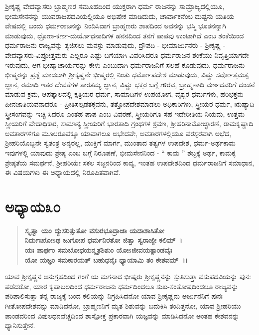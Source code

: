 ಶ‍್ರೀಕೃಷ್ಣ ವೇದವ್ಯಾಸರು ಬ್ರಾಹ್ಮಣರ ಸಮೂಹದಿಂದ ಯುಕ್ತರಾಗಿ ಧರ್ಮ ರಾಜನನ್ನು ಸಾಮ್ರಾಜ್ಯದಲ್ಲಿಯೂ, ಭೀಮಸೇನನನ್ನು ಯುವರಾಜಪದವಿಯಲ್ಲಿಯೂ ಅಭಿಷೇಕ ಮಾಡಿದುದು, ಚಾರ್ವಾಕನೆಂಬ ದುಷ್ಟನು ಯತಿಯ ವೇಷದಲ್ಲಿ ಬಂದು ಧರ್ಮರಾಜನನ್ನು ನಿಂದಿಸಿದಾಗ ಬ್ರಾಹ್ಮಣರು ಶಾಪದಿಂದ ಅವನನ್ನು ಭಸ್ಮಿ ಭೂತನನ್ನಾಗಿ ಮಾಡುವುದು, ದ್ರೋಣ-\-ಕರ್ಣ-ದುರ್ಯೊಧನಾದಿಗಳ ಹನನದಿಂದ ತನಗೆ ಪಾಪವು ಉಂಟಾಗಿದೆ ಎಂಬ ಶಂಕೆಯಿಂದ ಧರ್ಮರಾಜನು ರಾಜ್ಯವನ್ನು ತ್ಯಜಿಸಲು ಮನಸ್ಸು ಮಾಡುವುದು, ದ್ರೌಪದಿ - ಭೀಮಾರ್ಜುನರು - ಶ‍್ರೀಕೃಷ್ಣ - ವೇದವ್ಯಾಸರು-ವಿಪ್ರೋತ್ತಮರು ಎಲ್ಲರೂ ಎಷ್ಟು ಬಗೆಯಾಗಿ ವಿವರಿಸಿದರೂ ಧರ್ಮರಾಜನ ಶಂಕೆಯು ನಿವೃತ್ತಿಯಾಗದೇ ಇರುವುದು, ಆಗ ಭೀಷ್ಮಾಚಾರ್ಯರನ್ನು ಕೇಳು ಎಂಬುದಾಗಿ ಧರ್ಮರಾಜನಿಗೆ ಸಲಹೆ ಕೊಡುವುದು, ಧರ್ಮರಾಜನು ಭೀಷ್ಮರನ್ನು ಪ್ರಶ್ನೆ ಮಾಡಲಾಗಿ ಶ‍್ರೀಕೃಷ್ಣನೇ ಭೀಷ್ಮರಲ್ಲಿ ನಿಂತು ಧರ್ಮೋಪದೇಶ ಮಾಡುವುದು, ವಿಷ್ಣು ಸರ್ವೋತ್ತಮತ್ವ ಜ್ಞಾನ, ರಮಾದಿ ಇತರ ದೇವತೆಗಳ ತಾರತಮ್ಯ ಜ್ಞಾನ, ವಿಷ್ಣು ಭಕ್ತರ ಬಗ್ಗೆ ಗೌರವ, ಬ್ರಾಹ್ಮಣಾದಿ ವರ್ಣದವರಿಗೆ ದಂಡನೆ ಮಾಡುವ ಕ್ರಮ, ಆಪತ್ಕಾಲದಲ್ಲಿ ಕ್ಷತ್ರಿಯರ ಧರ್ಮ, ಸಾಮಾದಿಗಳ ಉಪಯೋಗ, ವೈಶ್ಯರ ಧರ್ಮಗಳು, ಹರಿಭಕ್ತನು ಹೀನಜಾತಿಯವನಾದರೂ - ಪ್ರೀತಿಸಲ್ಪಡತಕ್ಕವನು, ತತ್ತೋಪದೇಶಮಾಡಲು ಅಧಿಕಾರಿಗಳು, ಸ್ತ್ರೀಯರ ಧರ್ಮ, ಋಷ್ಯಾದಿ ಸ್ತ್ರೀಸಂಗವನ್ನು ಇಚ್ಛಿ ಸಿದರೂ ಎಂತಹ ಪಾಪ ಎಂಬ ವಿವರಣೆ, ಸ್ತ್ರೀಯರಿಗೂ ಸಹ ಇದೇರೀತಿಯ ನಿಯಮ, ಉತ್ತಮ ಸ್ತ್ರೀಯರಿಗೆ ವೇದಾಧಿಕಾರ, ಸಾಮಾನ್ಯ ಸ್ತ್ರೀಯರಿಗೆ ಭಾರತಾದಿ ಗ್ರಂಥಗಳ ಶ್ರವಣ, ಶ‍್ರೀಹರಿನಾಮೋಚ್ಛಾರಣೆ, ರಾಮಕೃಷ್ಣಾದಿ ಅವತಾರಗಳಿಗೂ ಮೂಲರೂಪಕ್ಕೂ ಯಾವಾಗಲೂ ಅಭೇದವೇ, ಅವತಾರಗಳಲ್ಲಿಯೂ ಪರಸ್ಪರವಾಗಿ ಅಭೆದ, ಶ‍್ರೀಹರಿಯೊಬ್ಬನೇ ಸ್ವತಂತ್ರ ಅನ್ಯರಲ್ಲ, ಮುಕ್ತಿಗೆ ಮಾರ್ಗ, ಮುಂತಾದ ತತ್ವಗಳ ಉಪದೇಶ, ಧರ್ಮ-ಅರ್ಥಕಾಮ ಇವುಗಳಲ್ಲಿ ಯಾವುದು ಶ್ರೇಷ್ಠ ಎಂಬ ಬಗ್ಗೆ ನಿರೂಪಣೆ, ಭೀಮಸೇನನಿಂದ - “ ಕಾಮ ” ಶಬ್ದಕ್ಕೆ ಅರ್ಥ, ಕಾಮಕ್ಕೆ ಶ್ರೇಷ್ಠತೆಯ ಸಮರ್ಥನೆ, ಶ‍್ರೀಹರಿಯೇ ಸಕಲ ಸಜ್ಜನರಿಂದ ಕಾವ್ಯ, ಇಂತಹ ಉಪದೇಶದಿಂದ ಧರ್ಮರಾಜನಿಗೆ ಸಮಾಧಾನ, ಈ ವಿಷಯಗಳು ಈ ಅಧ್ಯಾಯದಲ್ಲಿ ನಿರೂಪಿತವಾಗಿವೆ.


\section*{ಅಧ್ಯಾಯ\enginline{-}೩೦}

\begin{verse}
\textbf{ಸ್ಕೃತ್ವಾ ಯಂ ದ್ಯುಸರಿತ್ಸುತೋ ವಸುರಭೂದ್ರಾಜಾ ಯದಾಶಾಸಿತೋ}\\\textbf{ನಿರ್ದುಃಖೋsಥ ಜುಗೋಪ ಧರ್ಮನಿರತೋ ಜಿತ್ವಾ ಸ್ವರಾಜ್ಯೇ ಕಲಿಮ್~।}\\\textbf{ಯಃ ಪಾರ್ಥಂ ಸಮಬೋಧಯನ್ಮೃತಶಿಶುಂ ಯೋsಜೀವಯತ್ಪಾಂಡವೈಃ}\\\textbf{ ಯೋ ಯಜ್ಞಂ ಸಮಕಾರಯತ್‌ ಬಹುಧನೈಃ ಧ್ಯಾಯಾಮಿ ತಂ ಕೇಶವಮ್~।।}
\end{verse}

\newpage

ಯಾವ ಶ‍್ರೀಕೃಷ್ಣನ ಅನುಗ್ರಹದಿಂದ ಗಂಗೆ ಯ ಮಗನಾದ ಭೀಷ್ಕರು ಶ‍್ರೀಕೃಷ್ಣನನ್ನು ಸ್ತುತಿಸುತ್ತಾ ವಸುಪದವಿಯನ್ನು ಪುನಃ ಪಡೆದರೋ, ಯಾರ ಕೃಪಾಬಲದಿಂದ ಧರ್ಮರಾಜನು ಧರ್ಮದಿಂದಲೂ ಸುಖ-ಸಂತೋಷದಿಂದಲೂ ರಾಜ್ಯವನ್ನು ಪರಿಪಾಲಿಸುತ್ತಾ ತನ್ನ ರಾಜ್ಯಕ್ಕೆ ಬಂದ ಕಲಿಯನ್ನು ನಿಗ್ರಹಿಸಿದನೋ ಯಾವ ಶ‍್ರೀಕೃಷ್ಣನು ಅರ್ಜುನನಿಗೆ ಪುನಃ ಗೀತೋಪದೇಶವನ್ನು ಮಾಡಿದನೋ, ಬ್ರಾಹ್ಮಣನಿಗೆ ಮೃತ ಶಿಶುವನ್ನು ಬದುಕಿಸಿ ತಂದಿತ್ತನೋ, ಯಾವ ಶ‍್ರೀಹರಿಯು ಪಾಂಡವರಿಂದ ವಿಪುಲಧನವೆಚ್ಚದಿಂದ ಶಾಸ್ಪೋಕ್ತ ಪ್ರಕಾರವಾಗಿ ಯಜ್ಞವನ್ನು ಮಾಡಿಸಿದನೋ ಅಂತಹ ಕೇಶವನನ್ನು ಧ್ಯಾನಿಸುತ್ತೇನೆ.

